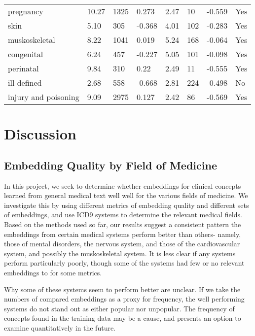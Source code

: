 \documentclass[10pt]{article}
\def\blu#1{{\color{blu}#1}}
\def\ora#1{{\color{ora}#1}}
\begin{document}
\begin{table*}[]
\begin{tabular}{llllllll}
		pregnancy            & 10.27     & 1325         & 0.273            & 2.47     & 10           & \blu{-0.559}     & Yes        \\
		skin                 & 5.10      & 305          & \blu{-0.368}     & 4.01     & 102          & \blu{-0.283}     & Yes        \\
		muskoskeletal        & 8.22      & 1041         & \ora{0.019}      & 5.24     & 168          & \blu{-0.064}     & Yes        \\
		congenital           & 6.24      & 457          & \blu{-0.227}     & 5.05     & 101          & \blu{-0.098}     & Yes        \\
		perinatal            & 9.84      & 310          & 0.22             & 2.49     & 11           & \blu{-0.555}     & Yes        \\
		ill-defined          & 2.68      & 558          & \blu{-0.668}     & 2.81     & 224          & \blu{-0.498}     & No         \\
		injury and poisoning & 9.09      & 2975         & 0.127            & 2.42     & 86           & \blu{-0.569}     & Yes       
	\end{tabular}
\end{table*}

\section{Discussion}

\subsection{Embedding Quality by Field of Medicine}
In this project, we seek to determine whether embeddings for clinical concepts learned from general medical text well well for the various fields of medicine. We investigate this by using different metrics of embedding quality and different sets of embeddings, and use ICD9 systems to determine the relevant medical fields. Based on the methods used so far, our results suggest a consistent pattern the embeddings from certain medical systems perform better than others- namely, those of mental disorders, the nervous system, and those of the cardiovascular system, and possibly the muskoskeletal system. It is less clear if any systems perform particularly poorly, though some of the systems had few or no relevant embeddings to for some metrics. 

Why some of these systems seem to perform better are unclear. If we take the numbers of compared embeddings as a proxy for frequency, the well performing systems do not stand out as either popular nor unpopular. The frequency of concepts found in the training data may be a cause, and presents an option to examine quantitatively in the future.
\end{document}
